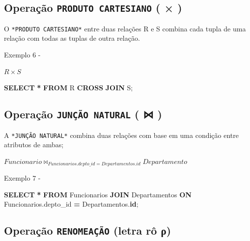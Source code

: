 \documentclass[
]{book}
\newenvironment{Shaded}{\begin{snugshade}}{\end{snugshade}}
\newcommand{\KeywordTok}[1]{\textcolor[rgb]{0.13,0.29,0.53}{\textbf{#1}}}
\newcommand{\NormalTok}[1]{#1}
\newcommand{\OperatorTok}[1]{\textcolor[rgb]{0.81,0.36,0.00}{\textbf{#1}}}
\begin{document}
\subsection{\texorpdfstring{Operação \texttt{PRODUTO\ CARTESIANO} ( × )}{Operação PRODUTO CARTESIANO ( × )}}\label{operauxe7uxe3o-produto-cartesiano}

O \texttt{*PRODUTO\ CARTESIANO*} entre duas relações R e S combina cada tupla de uma relação com todas as tuplas de outra relação.

Exemplo 6 -

\(R \times S\)

\begin{Shaded}
\begin{Highlighting}[]
  \KeywordTok{SELECT} \OperatorTok{*} \KeywordTok{FROM}\NormalTok{ R }\KeywordTok{CROSS} \KeywordTok{JOIN}\NormalTok{ S;}
\end{Highlighting}
\end{Shaded}

\subsection{\texorpdfstring{Operação \texttt{JUNÇÃO\ NATURAL} ( ⋈ )}{Operação JUNÇÃO NATURAL ( ⋈ )}}\label{operauxe7uxe3o-junuxe7uxe3o-natural}

A \texttt{*JUNÇÃO\ NATURAL*} combina duas relações com base em uma condição entre atributos de ambas;

\(Funcionario \bowtie_{Funcionarios.depto\_id = Departamentos.id} Departamento\)

Exemplo 7 -

\begin{Shaded}
\begin{Highlighting}[]

\KeywordTok{SELECT} \OperatorTok{*} \KeywordTok{FROM} 
\NormalTok{    Funcionarios}
  \KeywordTok{JOIN} 
\NormalTok{    Departamentos}
  \KeywordTok{ON} 
\NormalTok{    Funcionarios.depto\_id }\OperatorTok{=}\NormalTok{ Departamentos.}\KeywordTok{id}\NormalTok{;}
\end{Highlighting}
\end{Shaded}

\subsection{\texorpdfstring{Operação \texttt{RENOMEAÇÃO} (letra rô ρ)}{Operação RENOMEAÇÃO (letra rô ρ)}}\label{operauxe7uxe3o-renomeauxe7uxe3o-letra-ruxf4-ux3c1}
\end{document}
